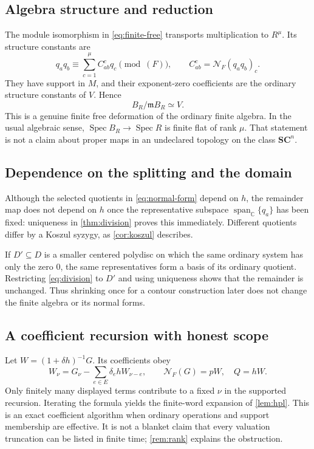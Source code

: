 \documentclass[11pt,letterpaper]{article}
\theoremstyle{definition}
\theoremstyle{remark}
\newcommand{\SC}{\mathbf{SC}}
\newcommand{\C}{\mathbb C}
\newcommand{\mm}{\mathfrak m}
\newcommand{\NF}{\mathcal N_F}
\newcommand{\Spec}{\operatorname{Spec}}
\numberwithin{equation}{section}
\begin{document}
\subsection{Algebra structure and reduction}
The module isomorphism in \eqref{eq:finite-free} transports multiplication to $R^\mu$. Its structure constants are
\begin{equation}\label{eq:structure}
 q_aq_b\equiv\sum_{c=1}^\mu C_{ab}^cq_c\pmod{(F)},
 \qquad C_{ab}^c=\NF(q_aq_b)_c.
\end{equation}
They have support in $M$, and their exponent-zero coefficients are the ordinary structure constants of $V$. Hence
\begin{equation}\label{eq:special-fiber}
 B_R/\mm B_R\simeq V.
\end{equation}
This is a genuine finite free deformation of the ordinary finite algebra. In the usual algebraic sense, $\Spec B_R\to\Spec R$ is finite flat of rank $\mu$. That statement is not a claim about proper maps in an undeclared topology on the class $\SC^n$.

\subsection{Dependence on the splitting and the domain}
Although the selected quotients in \eqref{eq:normal-form} depend on $h$, the remainder map does not depend on $h$ once the representative subspace $\operatorname{span}_\C\{q_a\}$ has been fixed: uniqueness in \cref{thm:division} proves this immediately. Different quotients differ by a Koszul syzygy, as \cref{cor:koszul} describes.

If $D'\subseteq D$ is a smaller centered polydisc on which the same ordinary system has only the zero $0$, the same representatives form a basis of its ordinary quotient. Restricting \eqref{eq:division} to $D'$ and using uniqueness shows that the remainder is unchanged. Thus shrinking once for a contour construction later does not change the finite algebra or its normal forms.

\subsection{A coefficient recursion with honest scope}
Let $W=(1+\delta h)^{-1}G$. Its coefficients obey
\begin{equation}\label{eq:recursion}
 W_\nu=G_\nu-\sum_{e\in E}\delta_e hW_{\nu-e},
 \qquad
 \NF(G)=pW,\quad Q=hW.
\end{equation}
Only finitely many displayed terms contribute to a fixed $\nu$ in the supported recursion. Iterating the formula yields the finite-word expansion of \cref{lem:hpl}. This is an exact coefficient algorithm when ordinary operations and support membership are effective. It is not a blanket claim that every valuation truncation can be listed in finite time; \cref{rem:rank} explains the obstruction.
\end{document}
